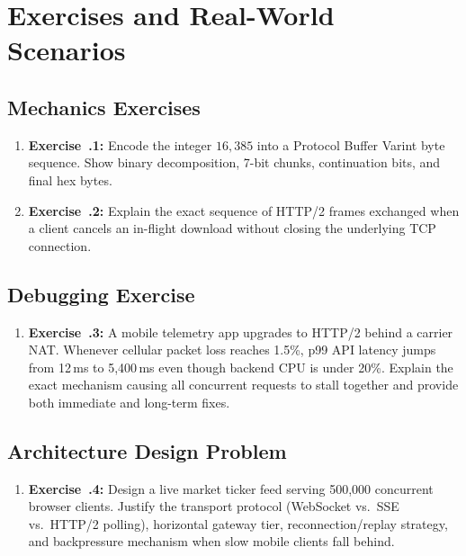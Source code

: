 \section{Exercises and Real-World Scenarios}

\subsection{Mechanics Exercises}
\begin{enumerate}[leftmargin=15pt]
  \item \textbf{Exercise~\thechapter.1:} Encode the integer $16{,}385$ into a Protocol Buffer Varint byte sequence. Show binary decomposition, 7-bit chunks, continuation bits, and final hex bytes.
  \item \textbf{Exercise~\thechapter.2:} Explain the exact sequence of HTTP/2 frames exchanged when a client cancels an in-flight download without closing the underlying TCP connection.
\end{enumerate}

\subsection{Debugging Exercise}
\begin{enumerate}[leftmargin=15pt]
  \item \textbf{Exercise~\thechapter.3:} A mobile telemetry app upgrades to HTTP/2 behind a carrier NAT. Whenever cellular packet loss reaches 1.5\%, p99 API latency jumps from 12\,ms to 5,400\,ms even though backend CPU is under 20\%. Explain the exact mechanism causing all concurrent requests to stall together and provide both immediate and long-term fixes.
\end{enumerate}

\subsection{Architecture Design Problem}
\begin{enumerate}[leftmargin=15pt]
  \item \textbf{Exercise~\thechapter.4:} Design a live market ticker feed serving 500,000 concurrent browser clients. Justify the transport protocol (WebSocket vs.\ SSE vs.\ HTTP/2 polling), horizontal gateway tier, reconnection/replay strategy, and backpressure mechanism when slow mobile clients fall behind.
\end{enumerate}

